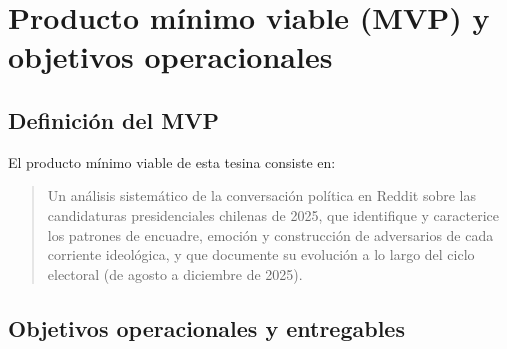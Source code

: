 \documentclass[
  letterpaper,
  numbers=noendperiod,
  fontsize=11pt,
  DIV=12,
  titlepage=false]{scrreprt}
\begin{document}
\section{Producto mínimo viable (MVP) y objetivos
operacionales}\label{producto-muxednimo-viable-mvp-y-objetivos-operacionales}

\subsection{Definición del MVP}\label{definiciuxf3n-del-mvp}

El producto mínimo viable de esta tesina consiste en:

\begin{quote}
Un análisis sistemático de la conversación política en Reddit sobre las
candidaturas presidenciales chilenas de 2025, que identifique y
caracterice los patrones de encuadre, emoción y construcción de
adversarios de cada corriente ideológica, y que documente su evolución a
lo largo del ciclo electoral (de agosto a diciembre de 2025).
\end{quote}

\subsection{Objetivos operacionales y
entregables}\label{objetivos-operacionales-y-entregables}
\end{document}

